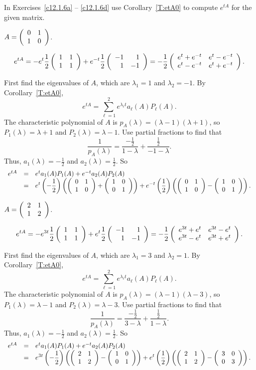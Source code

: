 \documentclass{ximera}
\begin{document}
\noindent  In Exercises~\ref{c12.1.6a} -- \ref{c12.1.6d} use Corollary~\ref{T:etA0} to compute $e^{tA}$ for the given matrix.
\begin{exercise} \label{c12.1.6a}
$A = \left(\begin{array}{rr} 0 & 1\\ 1 &0\end{array}\right)$.

\begin{solution}
\ans
\[
e^{tA} = -e^t\frac{1}{2}\left(\begin{array}{rr} 1 & 1\\ 1 &1\end{array}\right) +
e^{-t}\frac{1}{2}\left(\begin{array}{rr} -1 & 1\\ 1 &-1\end{array}\right)
= -\frac{1}{2}\left(\begin{array}{cc} e^{t} + e^{-t} & e^t - e^{-t}\\ e^t - e^{-t} &e^t + e^{-t}\end{array}\right).
\]

\soln First find the eigenvalues of $A$, which are $\lambda_1 = 1$ and
$\lambda_2 = -1$.  By Corollary~\ref{T:etA0},
\[
e^{tA} = \sum_{\ell = 1}^2 e^{\lambda_\ell t}a_\ell(A)P_\ell(A).
\]
The characteristic polynomial of $A$ is $p_A(\lambda) = (\lambda -
1)(\lambda + 1)$, so $P_1(\lambda) = \lambda + 1$ and $P_2(\lambda) =
\lambda - 1$.  Use partial fractions to find that
\[
\frac{1}{p_A(\lambda)} = \frac{-\frac{1}{2}}{1 - \lambda} + \frac{\frac{1}{2}}
{-1 - \lambda}.
\]
Thus, $a_1(\lambda) = -\frac{1}{2}$ and $a_2(\lambda) = \frac{1}{2}$.  So
\[
\begin{array}{rcl}
e^{tA} & = & e^ta_1(A)P_1(A) + e^{-t}a_2(A)P_2(A) \\
& = & \displaystyle e^t\left(-\frac{1}{2}\right)\left(\left(\begin{array}{rr} 0 & 1\\ 1 &0\end{array}\right) +
\left(\begin{array}{rr} 1 & 0\\ 0 &1\end{array}\right)\right) + e^{-t}\left(\frac{1}{2}\right)
\left(\left(\begin{array}{rr} 0 & 1\\ 1 &0\end{array}\right) - \left(\begin{array}{rr} 1 & 0\\ 0 &1\end{array}\right)\right).
\end{array}
\]

\end{solution}
\end{exercise}
\begin{exercise} \label{c12.1.6b}
$A = \left(\begin{array}{rr} 2 & 1\\ 1 &2\end{array}\right)$.

\begin{solution}
\ans
\[
e^{tA} = -e^{3t}\frac{1}{2}\left(\begin{array}{rr} 1 & 1\\ 1 &1\end{array}\right) +
e^t\frac{1}{2}\left(\begin{array}{rr} -1 & 1\\ 1 &-1\end{array}\right)
= -\frac{1}{2}\left(\begin{array}{cc} e^{3t} + e^{t} & e^{3t} - e^{t}\\ e^{3t} - e^{t} &e^{3t} + e^{t}\end{array}\right).
\]

\soln First find the eigenvalues of $A$, which are $\lambda_1 = 3$ and
$\lambda_2 = 1$.  By Corollary~\ref{T:etA0},
\[
e^{tA} = \sum_{\ell = 1}^2 e^{\lambda_\ell t}a_\ell(A)P_\ell(A).
\]
The characteristic polynomial of $A$ is $p_A(\lambda) = (\lambda -
1)(\lambda - 3)$, so $P_1(\lambda) = \lambda - 1$ and $P_2(\lambda) =
\lambda - 3$.  Use partial fractions to find that
\[
\frac{1}{p_A(\lambda)} = \frac{-\frac{1}{2}}{3 - \lambda} + \frac{\frac{1}{2}}
{1 - \lambda}.
\]
Thus, $a_1(\lambda) = -\frac{1}{2}$ and $a_2(\lambda) = \frac{1}{2}$.  So
\[
\begin{array}{rcl}
e^{tA} & = & e^ta_1(A)P_1(A) + e^{-t}a_2(A)P_2(A) \\
& = & \displaystyle e^{3t}\left(-\frac{1}{2}\right)\left(\left(\begin{array}{rr} 2 & 1\\ 1 &2\end{array}\right) -
\left(\begin{array}{rr} 1 & 0\\ 0 &1\end{array}\right)\right) + e^{t}\left(\frac{1}{2}\right)
\left(\left(\begin{array}{rr} 2 & 1\\ 1 &2\end{array}\right) - \left(\begin{array}{rr} 3 & 0\\ 0 &3\end{array}\right)\right).
\end{array}
\]

\end{solution}
\end{exercise}
\end{document}
